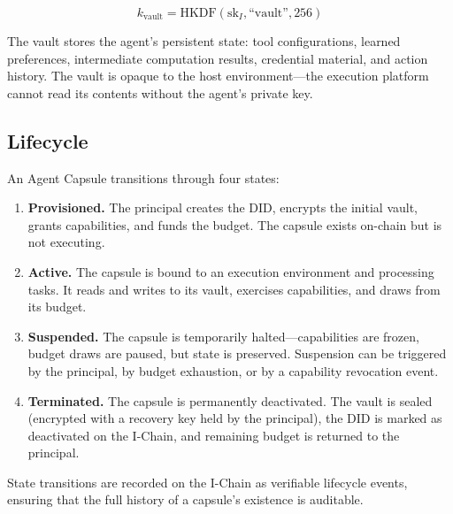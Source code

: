 \begin{equation}\label{eq:vault-key}
    k_{\text{vault}} = \text{HKDF}(\text{sk}_I, \text{``vault''}, 256)
\end{equation}

The vault stores the agent's persistent state: tool configurations, learned preferences, intermediate computation results, credential material, and action history. The vault is opaque to the host environment---the execution platform cannot read its contents without the agent's private key.

\subsection{Lifecycle}

An Agent Capsule transitions through four states:

\begin{enumerate}
    \item \textbf{Provisioned.} The principal creates the DID, encrypts the initial vault, grants capabilities, and funds the budget. The capsule exists on-chain but is not executing.
    \item \textbf{Active.} The capsule is bound to an execution environment and processing tasks. It reads and writes to its vault, exercises capabilities, and draws from its budget.
    \item \textbf{Suspended.} The capsule is temporarily halted---capabilities are frozen, budget draws are paused, but state is preserved. Suspension can be triggered by the principal, by budget exhaustion, or by a capability revocation event.
    \item \textbf{Terminated.} The capsule is permanently deactivated. The vault is sealed (encrypted with a recovery key held by the principal), the DID is marked as deactivated on the I-Chain, and remaining budget is returned to the principal.
\end{enumerate}

State transitions are recorded on the I-Chain as verifiable lifecycle events, ensuring that the full history of a capsule's existence is auditable.

